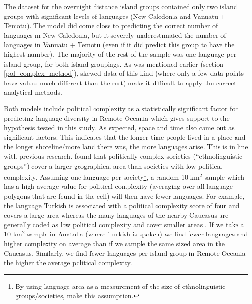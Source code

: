 \documentclass[a4paper,10pt]{article} %
\begin{document}
The dataset for the overnight distance island groups contained only two island groups with significant levels of languages (New Caledonia and Vanuatu + Temotu). The model did come close to predicting the correct number of languages in New Caledonia, but it severely underestimated the number of languages in Vanuatu + Temotu (even if it did predict this group to have the highest number). The majority of the rest of the sample was one language per island group, for both island groupings. As was mentioned earlier (section \ref{pol_complex_method}), skewed data of this kind (where only a few data-points have values much different than the rest) make it difficult to apply the correct analytical methods.

Both models include political complexity as a statistically significant factor for predicting language diversity in Remote Oceania which gives support to the hypothesis tested in this study. As expected, space and time also came out as significant factors. This indicates that the longer time people lived in a place and the longer shoreline/more land there was, the more languages arise. This is in line with previous research. \citet{curriemace2009} found that politically complex societies (``ethnolinguistic groups'') cover a larger geographical area than societies with low political complexity.  Assuming one language per society\footnote{By using language area as a measurement of the size of ethnolinguistic groups/societies, \citet{curriemace2009} make this assumption.}, a random 10 km$^2$ sample which has a high average value for political complexity (averaging over all language polygons that are found in the cell) will then have fewer languages. For example, the language Turkish is associated with a political complexity score of four \citep{d_place_all} and covers a large area whereas the many languages of the nearby Caucasus are generally coded as low political complexity and cover smaller areas \citep{ethnologue2005}. If we take a 10 km$^2$ sample in Anatolia (where Turkish is spoken) we find fewer languages and higher complexity on average than if we sample the same sized area in the Caucasus. Similarly, we find fewer languages per island group in Remote Oceania the higher the average political complexity.
\end{document}
